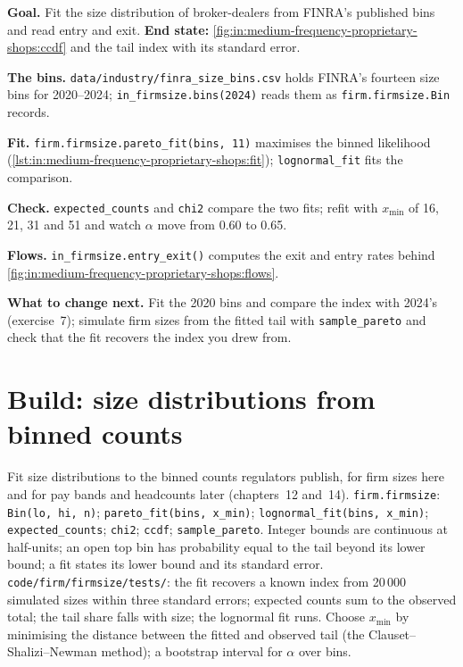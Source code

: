 \begin{tutorial}
\textbf{Goal.} Fit the size distribution of broker-dealers from FINRA's published bins and read entry and exit.
\textbf{End state:} \cref{fig:in:medium-frequency-proprietary-shops:ccdf} and the tail index with its standard error.
\begin{tutsteps}
\item \textbf{The bins.} \texttt{data/industry/finra\_size\_bins.csv} holds FINRA's fourteen size bins for 2020--2024;
\texttt{in\_firmsize.bins(2024)} reads them as \texttt{firm.firmsize.Bin} records.
\item \textbf{Fit.} \texttt{firm.firmsize.pareto\_fit(bins, 11)} maximises the binned likelihood
(\cref{lst:in:medium-frequency-proprietary-shops:fit}); \texttt{lognormal\_fit} fits the comparison.
\label{lst:in:medium-frequency-proprietary-shops:fit}
\item \textbf{Check.} \texttt{expected\_counts} and \texttt{chi2} compare the two fits; refit with $x_{\min}$ of 16, 21,
31 and 51 and watch $\alpha$ move from 0.60 to 0.65.
\item \textbf{Flows.} \texttt{in\_firmsize.entry\_exit()} computes the exit and entry rates behind
\cref{fig:in:medium-frequency-proprietary-shops:flows}.
\end{tutsteps}
\end{tutorial}

\textbf{What to change next.} Fit the 2020 bins and compare the index with 2024's (exercise~7); simulate firm sizes from
the fitted tail with \texttt{sample\_pareto} and check that the fit recovers the index you drew from.

\section{Build: size distributions from binned counts}\label{bld:in:medium-frequency-proprietary-shops:firmsize}

\begin{build}
 Fit size distributions to the binned counts regulators publish, for firm sizes here and for pay bands
and headcounts later (chapters~12 and~14).
 \texttt{firm.firmsize}: \texttt{Bin(lo, hi, n)}; \texttt{pareto\_fit(bins, x\_min)};
\texttt{lognormal\_fit(bins, x\_min)}; \texttt{expected\_counts}; \texttt{chi2}; \texttt{ccdf}; \texttt{sample\_pareto}.
 Integer bounds are continuous at half-units; an open top bin has probability equal to the tail beyond its
lower bound; a fit states its lower bound and its standard error.
 \texttt{code/firm/firmsize/tests/}: the fit recovers a known index from 20\,000 simulated
sizes within three standard errors; expected counts sum to the observed total; the tail share falls with size; the
lognormal fit runs.
 Choose $x_{\min}$ by minimising the distance between the fitted and observed tail (the Clauset--Shalizi--Newman
method); a bootstrap interval for $\alpha$ over bins.
\end{build}


